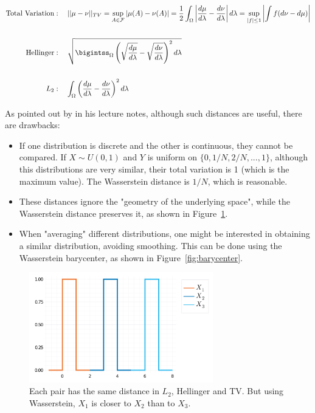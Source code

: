 \documentclass[10pt]{article}
\theoremstyle{definition}
\begin{document}
\begin{align*} 
\text{Total Variation} &: \quad || \mu - \nu ||_{TV} =
\sup_{A \in \mathcal F} |\mu (A) - \nu(A)| = 
\frac{1}{2}\int_\Omega \left | \frac{d\mu}{d\lambda} - \frac{d\nu}{d\lambda} \right
|d\lambda
= \sup_{|f|\leq 1} \left |
\int f (d\nu - d\mu)\right|
\\
\\
\text{Hellinger} &: \quad \sqrt{\bigintss_\Omega \left(\sqrt{\frac{d\mu}{d\lambda}} -
\sqrt{\frac{d\nu}{d\lambda}} \right )^2d\lambda} \\
\\
L_2 &: \quad \int_\Omega \left(\frac{d\mu}{d\lambda} - \frac{d\nu}{d\lambda}\right)^2
d\lambda \\
\end{align*}

As pointed out by \citet{wassermanStatisicalMethods2018} in his lecture notes,
although such distances are useful, there are drawbacks:
\begin{itemize}
	\item If one distribution is discrete and the other is continuous,  they cannot
	be compared. If $X \sim U(0,1)$ and $Y$ is uniform on $\{0,1/N, 2/N,...,1\}$,
	although this distributions are very similar, their total variation is 1 (which is
	the maximum value). The Wasserstein distance is $1/N$, which is reasonable.
	\item These distances ignore the "geometry of the underlying space", while the
	Wasserstein distance preserves it, as shown in Figure~\ref{fig:distances}.
	\item When "averaging" different distributions, one might be interested in obtaining
	a similar distribution, avoiding smoothing. This can be done using the Wasserstein
	barycenter, as shown in Figure~\ref{fig:barycenter}.
\end{itemize}
\begin{figure}[h]
	\centering
	\includegraphics[width=8cm]{images/Distributions_Distances.png}
    \caption{Each pair has the same distance in $L_2$, Hellinger and TV. But using
    Wasserstein, $X_1$ is closer to $X_2$ than to $X_3$.}
    \label{fig:distances}
\end{figure}
\end{document}
